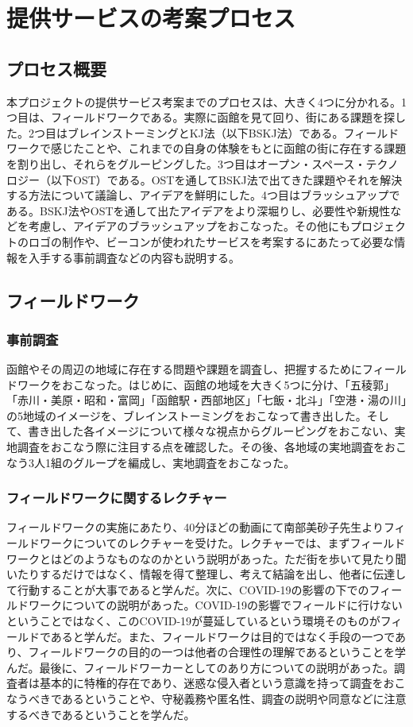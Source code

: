 \chapter{提供サービスの考案プロセス}

\section{プロセス概要}
本プロジェクトの提供サービス考案までのプロセスは、大きく4つに分かれる。1つ目は、フィールドワークである。実際に函館を見て回り、街にある課題を探した。2つ目はブレインストーミングとKJ法（以下BSKJ法）である。フィールドワークで感じたことや、これまでの自身の体験をもとに函館の街に存在する課題を割り出し、それらをグルーピングした。3つ目はオープン・スペース・テクノロジー（以下OST）である。OSTを通してBSKJ法で出てきた課題やそれを解決する方法について議論し、アイデアを鮮明にした。4つ目はブラッシュアップである。BSKJ法やOSTを通して出たアイデアをより深堀りし、必要性や新規性などを考慮し、アイデアのブラッシュアップをおこなった。その他にもプロジェクトのロゴの制作や、ビーコンが使われたサービスを考案するにあたって必要な情報を入手する事前調査などの内容も説明する。

\section{フィールドワーク}

\subsection{事前調査}
函館やその周辺の地域に存在する問題や課題を調査し、把握するためにフィールドワークをおこなった。はじめに、函館の地域を大きく5つに分け、「五稜郭」「赤川・美原・昭和・富岡」「函館駅・西部地区」「七飯・北斗」「空港・湯の川」の5地域のイメージを、ブレインストーミングをおこなって書き出した。そして、書き出した各イメージについて様々な視点からグルーピングをおこない、実地調査をおこなう際に注目する点を確認した。その後、各地域の実地調査をおこなう3人1組のグループを編成し、実地調査をおこなった。


\subsection{フィールドワークに関するレクチャー}
フィールドワークの実施にあたり、40分ほどの動画にて南部美砂子先生よりフィールドワークについてのレクチャーを受けた。レクチャーでは、まずフィールドワークとはどのようなものなのかという説明があった。ただ街を歩いて見たり聞いたりするだけではなく、情報を得て整理し、考えて結論を出し、他者に伝達して行動することが大事であると学んだ。次に、COVID-19の影響の下でのフィールドワークについての説明があった。COVID-19の影響でフィールドに行けないということではなく、このCOVID-19が蔓延しているという環境そのものがフィールドであると学んだ。また、フィールドワークは目的ではなく手段の一つであり、フィールドワークの目的の一つは他者の合理性の理解であるということを学んだ。最後に、フィールドワーカーとしてのあり方についての説明があった。調査者は基本的に特権的存在であり、迷惑な侵入者という意識を持って調査をおこなうべきであるということや、守秘義務や匿名性、調査の説明や同意などに注意するべきであるということを学んだ。


